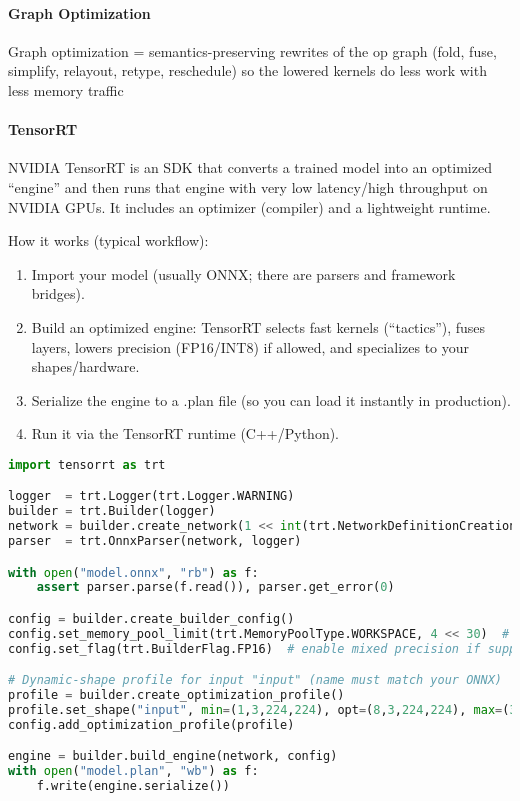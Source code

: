 \paragraph{Graph Optimization}
Graph optimization = semantics-preserving rewrites of the op graph (fold, fuse, simplify, relayout, retype, reschedule) so the lowered kernels do less work with less memory traffic

\paragraph{TensorRT} NVIDIA TensorRT is an SDK that converts a trained model into an optimized ``engine'' and then runs that engine with very low latency/high throughput on NVIDIA GPUs. It includes an optimizer (compiler) and a lightweight runtime.

How it works (typical workflow):
\begin{enumerate}
	\item Import your model (usually ONNX; there are parsers and framework bridges).
	\item Build an optimized engine: TensorRT selects fast kernels (“tactics”), fuses layers, lowers precision (FP16/INT8) if allowed, and specializes to your shapes/hardware.
	\item Serialize the engine to a .plan file (so you can load it instantly in production).
	\item Run it via the TensorRT runtime (C++/Python).
\end{enumerate}

\begin{lstlisting}[language=Python]
import tensorrt as trt

logger  = trt.Logger(trt.Logger.WARNING)
builder = trt.Builder(logger)
network = builder.create_network(1 << int(trt.NetworkDefinitionCreationFlag.EXPLICIT_BATCH))
parser  = trt.OnnxParser(network, logger)

with open("model.onnx", "rb") as f:
    assert parser.parse(f.read()), parser.get_error(0)

config = builder.create_builder_config()
config.set_memory_pool_limit(trt.MemoryPoolType.WORKSPACE, 4 << 30)  # workspace budget
config.set_flag(trt.BuilderFlag.FP16)  # enable mixed precision if supported

# Dynamic-shape profile for input "input" (name must match your ONNX)
profile = builder.create_optimization_profile()
profile.set_shape("input", min=(1,3,224,224), opt=(8,3,224,224), max=(32,3,224,224))
config.add_optimization_profile(profile)

engine = builder.build_engine(network, config)
with open("model.plan", "wb") as f:
    f.write(engine.serialize())
\end{lstlisting}



